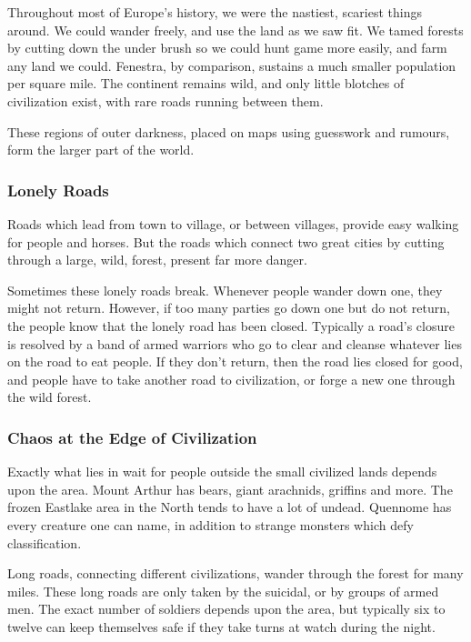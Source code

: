 \begin{multicols}{2}
Throughout most of Europe's history, we were the nastiest, scariest things around.
We could wander freely, and use the land as we saw fit.
We tamed forests by cutting down the under brush so we could hunt game more easily, and farm any land we could.
Fenestra, by comparison, sustains a much smaller population per square mile.
The continent remains wild, and only little blotches of civilization exist, with rare roads running between them.

These regions of outer darkness, placed on maps using guesswork and rumours, form the larger part of the world.

\subsubsection{Lonely Roads}

Roads which lead from town to village, or between villages, provide easy walking for people and horses.
But the roads which connect two great cities by cutting through a large, wild, forest, present far more danger.

Sometimes these lonely roads break.
Whenever people wander down one, they might not return.
However, if too many parties go down one but do not return, the people know that the lonely road has been closed.
Typically a  road's closure is resolved by a band of armed warriors who go to clear and cleanse whatever lies on the road to eat people.
If they don't return, then the road lies closed for good, and people have to take another road to civilization, or forge a new one through the wild forest.

\subsubsection{Chaos at the Edge of Civilization}

Exactly what lies in wait for people outside the small civilized lands depends upon the area.
Mount Arthur has bears, giant arachnids, griffins and more.
The frozen Eastlake area in the North tends to have a lot of undead.
Quennome has every creature one can name, in addition to strange monsters which defy classification.

Long roads, connecting different civilizations, wander through the forest for many miles.
These long roads are only taken by the suicidal, or by groups of armed men.
The exact number of soldiers depends upon the area, but typically six to twelve can keep themselves safe if they take turns at watch during the night.


\end{multicols}
